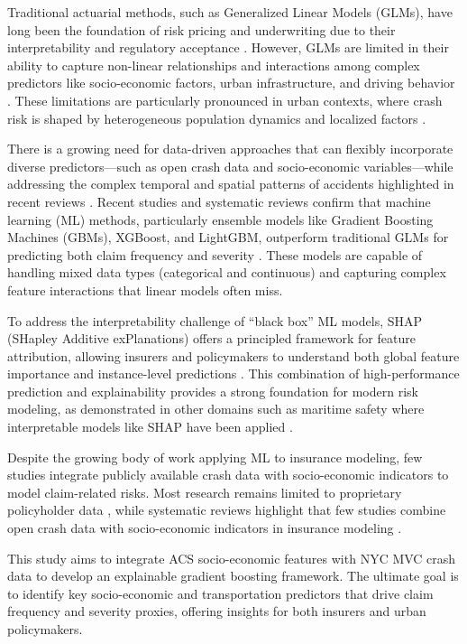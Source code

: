 \documentclass[
  number,
  review,
  3p]{elsarticle}
\begin{document}
Traditional actuarial methods, such as Generalized Linear Models (GLMs),
have long been the foundation of risk pricing and underwriting due to
their interpretability and regulatory acceptance \citep{henckaerts}.
However, GLMs are limited in their ability to capture non-linear
relationships and interactions among complex predictors like
socio-economic factors, urban infrastructure, and driving behavior
\citep{clemente}. These limitations are particularly pronounced in urban
contexts, where crash risk is shaped by heterogeneous population
dynamics and localized factors \citep{cabrera, brubacher}.

There is a growing need for data-driven approaches that can flexibly
incorporate diverse predictors---such as open crash data and
socio-economic variables---while addressing the complex temporal and
spatial patterns of accidents highlighted in recent reviews
\citep{grigorev, behboudi}. Recent studies and systematic reviews
confirm that machine learning (ML) methods, particularly ensemble models
like Gradient Boosting Machines (GBMs), XGBoost, and LightGBM,
outperform traditional GLMs for predicting both claim frequency and
severity \citep{clemente, mohamed, behboudi}. These models are capable
of handling mixed data types (categorical and continuous) and capturing
complex feature interactions that linear models often miss.

To address the interpretability challenge of ``black box'' ML models,
SHAP (SHapley Additive exPlanations) offers a principled framework for
feature attribution, allowing insurers and policymakers to understand
both global feature importance and instance-level predictions
\citep{lundberg, dong, ning}. This combination of high-performance
prediction and explainability provides a strong foundation for modern
risk modeling, as demonstrated in other domains such as maritime safety
where interpretable models like SHAP have been applied \citep{kim}.

Despite the growing body of work applying ML to insurance modeling, few
studies integrate publicly available crash data with socio-economic
indicators to model claim-related risks. Most research remains limited
to proprietary policyholder data \citep{henckaerts, mohamed}, while
systematic reviews highlight that few studies combine open crash data
with socio-economic indicators in insurance modeling
\citep{ali, behboudi}.

This study aims to integrate ACS socio-economic features with NYC MVC
crash data to develop an explainable gradient boosting framework. The
ultimate goal is to identify key socio-economic and transportation
predictors that drive claim frequency and severity proxies, offering
insights for both insurers and urban policymakers.
\end{document}
